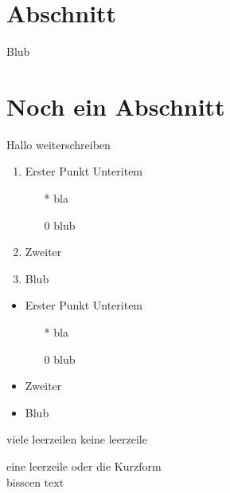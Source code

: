 \documentclass{article}
\begin{document}

\tableofcontents %

\newpage %

\listoftodos %


\newpage


 \section{Abschnitt}

 Blub

 \section{Noch ein Abschnitt}
 
 Hallo  weiterschreiben %

\begin{enumerate}
	\item{ Erster Punkt}
	\subitem Unteritem
	\begin{itemize}
		\item[*] bla
		\item[0] blub
	\end{itemize}
	\item Zweiter
	\item Blub
\end{enumerate}


\begin{itemize}
	\item{ Erster Punkt}
	\subitem Unteritem
	\begin{itemize}
		\item[*] bla
		\item[0] blub
	\end{itemize}
	\item Zweiter
	\item Blub
\end{itemize}


 viele leerzeilen 
 keine leerzeile

 eine leerzeile \newline
 oder die Kurzform \\
 bisscen text
\end{document}
